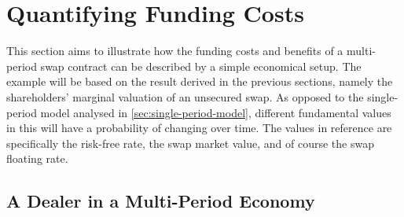 \documentclass[main.tex]{subfiles}
\begin{document}
    \section{Quantifying Funding Costs}

        This section aims to illustrate
        how the funding costs and benefits of a multi-period swap contract
        can be described by a simple economical setup.
        The example will be based on the result derived in the previous sections,
        namely the shareholders' marginal valuation of an unsecured swap.
        As opposed to the single-period model analysed in \cref{sec:single-period-model},
        different fundamental values in this  will have a probability of changing over time.
        The values in reference are specifically
        the risk-free rate,
        the swap market value,
        and of course the swap floating rate.

    \subsection{A Dealer in a Multi-Period Economy}
    \label{sec:swap-examples}
        
\end{document}
